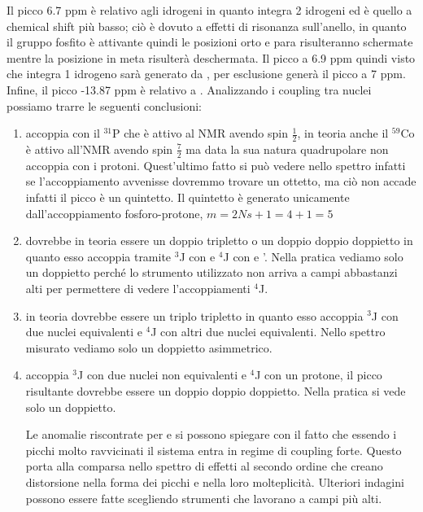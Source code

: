 Il picco 6.7 ppm è  relativo agli idrogeni  in quanto integra 2 idrogeni ed è quello a chemical shift più basso; ciò è dovuto a effetti di risonanza sull'anello, in quanto il gruppo fosfito è attivante quindi le posizioni orto e para risulteranno schermate mentre la posizione in meta risulterà deschermata. Il picco a 6.9 ppm quindi visto che integra 1 idrogeno sarà generato da ,  per esclusione  generà il picco a 7 ppm. Infine, il picco -13.87 ppm è relativo a . Analizzando i coupling tra nuclei possiamo trarre le seguenti conclusioni: \begin{enumerate}
    \item {} accoppia con il ${}^{31}$P che è attivo al NMR avendo spin $\frac{1}{2}$, in teoria anche il ${}^{59}$Co è attivo all'NMR avendo spin $\frac{7}{2}$ ma data la sua natura quadrupolare non accoppia con i protoni. Quest'ultimo fatto si può vedere nello spettro infatti se l'accoppiamento avvenisse dovremmo trovare un ottetto, ma ciò non accade infatti il picco è un quintetto. Il quintetto è generato unicamente dall'accoppiamento fosforo-protone, $m = 2Ns +1 = 4 +1 = 5$
    \item {} dovrebbe in teoria essere un doppio tripletto o un doppio doppio doppietto in quanto esso accoppia tramite ${}^3$J con   e ${}^4$J con  e   '. Nella pratica vediamo solo un doppietto perché lo strumento utilizzato non arriva a campi abbastanzi alti per permettere di vedere l'accoppiamenti ${}^4$J.
    \item {} in teoria dovrebbe essere un triplo tripletto in quanto esso accoppia ${}^3$J con due nuclei equivalenti e ${}^4$J con altri due nuclei equivalenti. Nello spettro misurato vediamo solo un doppietto asimmetrico.
    \item {} accoppia ${}^3$J con due nuclei non equivalenti e ${}^4$J con un protone, il picco risultante dovrebbe essere un doppio doppio doppietto. Nella pratica si vede solo un doppietto.

    Le anomalie riscontrate per  e  si possono spiegare con il fatto che essendo i picchi molto ravvicinati il sistema entra in regime di coupling forte. Questo porta alla comparsa nello spettro di effetti al secondo ordine che creano distorsione nella forma dei picchi e nella loro molteplicità. Ulteriori indagini possono essere fatte scegliendo strumenti che lavorano a campi più alti.
\end{enumerate}
